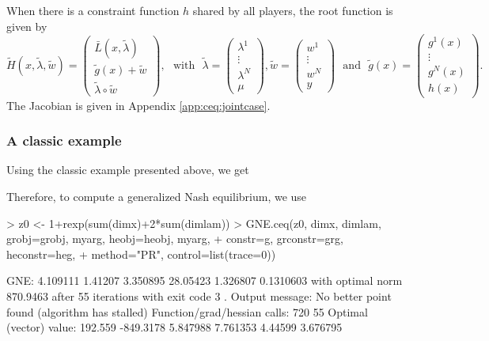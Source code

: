 \documentclass[11pt, a4paper]{article}
\newcommand{\txtm}[1]{\textrm{~~#1~~}}
\begin{document}
When there is a constraint function $h$ shared by all players, the root function is given by
$$
\widetilde H(x, \tilde \lambda, \tilde w) = 
\left( 
\begin{matrix}
\bar L(x, \tilde \lambda) \\
\tilde g(x) + \tilde w \\
\tilde \lambda \circ \tilde w 
\end{matrix}
\right) ,
\txtm{with}
\tilde \lambda = 
\left( 
\begin{matrix}
\lambda^1 \\
\vdots \\
\lambda^N \\
\mu
\end{matrix}
\right) 
,
\tilde w = 
\left( 
\begin{matrix}
w^1 \\
\vdots \\
w^N \\
y
\end{matrix}
\right) 
\txtm{and}
\tilde g(x) = 
\left( 
\begin{matrix}
g^1(x) \\
\vdots \\
g^N(x) \\
h(x)
\end{matrix}
\right) .
$$
The Jacobian is given in Appendix \ref{app:ceq:jointcase}.





\subsubsection{A classic example}
Using the classic example presented above, we get

Therefore, to compute a generalized Nash equilibrium, we use
\begin{Schunk}
\begin{Sinput}
> z0 <- 1+rexp(sum(dimx)+2*sum(dimlam))
> GNE.ceq(z0, dimx, dimlam, grobj=grobj, myarg, heobj=heobj, myarg, 
+ 	constr=g, grconstr=grg, heconstr=heg, 
+ 	method="PR", control=list(trace=0))
\end{Sinput}
\begin{Soutput}
GNE: 4.109111 1.41207 3.350895 28.05423 1.326807 0.1310603 
with optimal norm 870.9463 
after  55 iterations with exit code 3 .
Output message: No better point found (algorithm has stalled) 
Function/grad/hessian calls: 720 55 
Optimal (vector) value: 192.559 -849.3178 5.847988 7.761353 4.44599 3.676795 
\end{Soutput}
\end{Schunk}
\end{document}
